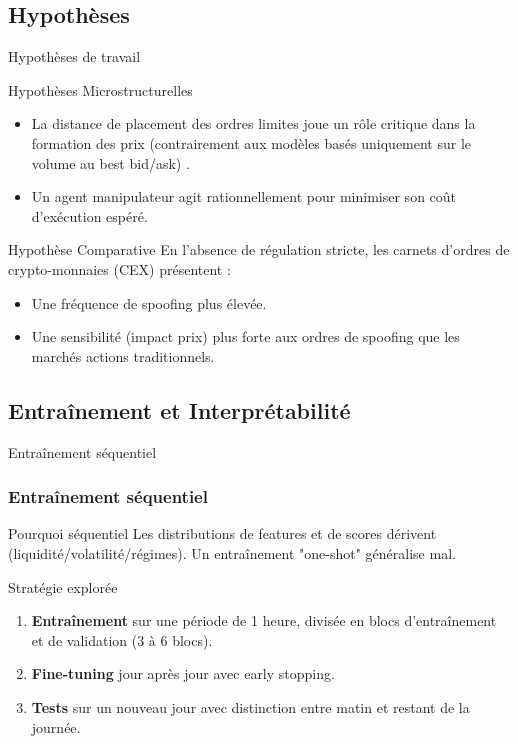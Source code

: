 \documentclass{beamer}
\begin{document}
\subsection{Hypothèses}
\begin{frame}{Hypothèses de travail}
    \begin{block}{Hypothèses Microstructurelles}
        \begin{itemize}
            \item La distance de placement des ordres limites joue un rôle critique dans la formation des prix (contrairement aux modèles basés uniquement sur le volume au best bid/ask) \cite{tao_2020}.
            \item Un agent manipulateur agit rationnellement pour minimiser son coût d'exécution espéré.
        \end{itemize}
    \end{block}

    \begin{block}{Hypothèse Comparative}
        En l'absence de régulation stricte, les carnets d'ordres de crypto-monnaies (CEX) présentent :
        \begin{itemize}
            \item Une fréquence de spoofing plus élevée.
            \item Une sensibilité (impact prix) plus forte aux ordres de spoofing que les marchés actions traditionnels.
        \end{itemize}
    \end{block}
\end{frame}



\subsection{Entraînement et Interprétabilité}
\begin{frame}{Entraînement séquentiel}
    \frametitle{Entraînement séquentiel}
    \begin{block}{Pourquoi séquentiel}
        Les distributions de features et de scores dérivent (liquidité/volatilité/régimes). Un entraînement "one-shot" généralise mal.
    \end{block}

    \begin{block}{Stratégie explorée}
        \begin{enumerate}
            \item \textbf{Entraînement} sur une période de 1 heure, divisée en blocs d'entraînement et de validation (3 à 6 blocs).
            \item \textbf{Fine-tuning} jour après jour avec early stopping.
            \item \textbf{Tests} sur un nouveau jour avec distinction entre matin et restant de la journée.
        \end{enumerate}
    \end{block}
\end{frame}
\end{document}
